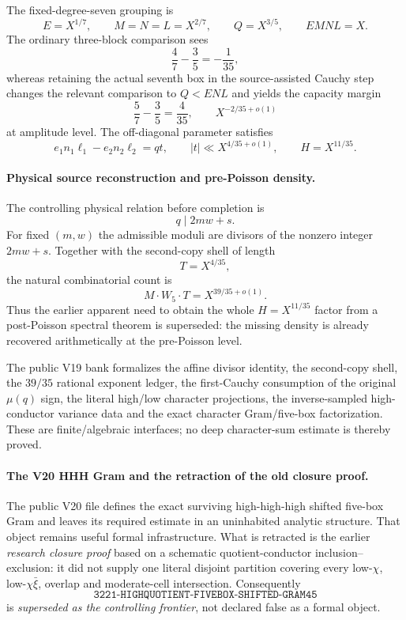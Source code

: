 \documentclass[11pt]{article}
\theoremstyle{definition}
\newcommand{\1}{\mathbf 1}
\begin{document}
The fixed-degree-seven grouping is
\[
E=X^{1/7},\qquad M=N=L=X^{2/7},\qquad Q=X^{3/5},
\qquad EMNL=X.
\]
The ordinary three-block comparison sees
\[
\frac47-\frac35=-\frac1{35},
\]
whereas retaining the actual seventh box in the source-assisted Cauchy step changes the
relevant comparison to $Q<ENL$ and yields the capacity margin
\[
\frac57-\frac35=\frac4{35},
\qquad
X^{-2/35+o(1)}
\]
at amplitude level.  The off-diagonal parameter satisfies
\[
e_1n_1\ell_1-e_2n_2\ell_2=qt,
\qquad
|t|\ll X^{4/35+o(1)},
\qquad
H=X^{11/35}.
\]

\paragraph{Physical source reconstruction and pre-Poisson density.}
The controlling physical relation before completion is
\[
\boxed{q\mid 2mw+s.}
\]
For fixed $(m,w)$ the admissible moduli are divisors of the nonzero integer $2mw+s$.
Together with the second-copy shell of length
\[
T=X^{4/35},
\]
the natural combinatorial count is
\[
M\cdot W_5\cdot T=X^{39/35+o(1)}.
\]
Thus the earlier apparent need to obtain the whole $H=X^{11/35}$ factor from a
post-Poisson spectral theorem is superseded: the missing density is already recovered
arithmetically at the pre-Poisson level.

The public V19 bank formalizes the affine divisor identity, the second-copy shell, the
$39/35$ rational exponent ledger, the first-Cauchy consumption of the original
$\mu(q)$ sign, the literal high/low character projections, the inverse-sampled
high-conductor variance data and the exact character Gram/five-box factorization.  These
are finite/algebraic interfaces; no deep character-sum estimate is thereby proved.

\paragraph{The V20 HHH Gram and the retraction of the old closure proof.}
The public V20 file defines the exact surviving high-high-high shifted five-box Gram and
leaves its required estimate in an uninhabited analytic structure.  That object remains
useful formal infrastructure.  What is retracted is the earlier \emph{research closure
proof} based on a schematic quotient-conductor inclusion--exclusion: it did not supply one
literal disjoint partition covering every low-$\chi$, low-$\chi\bar\xi$, overlap and
moderate-cell intersection.  Consequently
\[
\texttt{3221-HIGHQUOTIENT-FIVEBOX-SHIFTED-GRAM45}
\]
is \emph{superseded as the controlling frontier}, not declared false as a formal object.
\end{document}
